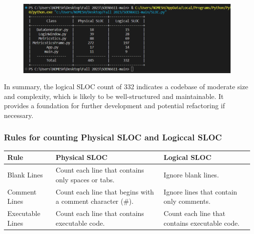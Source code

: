 {{\label{sec: Figure 5}
\begin{figure}[htp]
    \centering
    \includegraphics[width=15cm]{SLOC.png}
    \label{fig:Figure 5}
\end{figure}

\normalsize{In summary, the logical SLOC count of 332 indicates a codebase of moderate size and complexity, which is likely to be well-structured and maintainable. It provides a foundation for further development and potential refactoring if necessary. }


\subsubsection{Rules for counting Physical SLOC and Logiccal SLOC}
\begin{table}[H]
    \centering
    \begin{tabular}{|p{3cm}|p{7cm}|p{5cm}|} \hline 
         Rule  &  Physical SLOC & Logical SLOC\\ \hline 
         
         Blank Lines  & Count each line that contains only spaces or tabs. & Ignore blank lines.  \\ \hline 
         
         Comment Lines  & Count each line that begins with a comment character (\#). & Ignore lines that contain only comments.\\ \hline 
         
         Executable Lines  & Count each line that contains executable code. & Count each line that contains executable code. \\ \hline 
         

\end{tabular}
\end{table}}}
